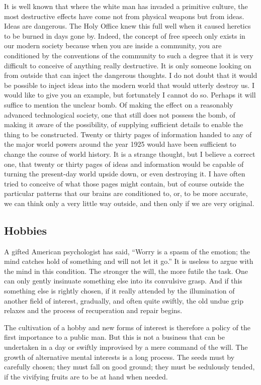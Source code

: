 \documentclass[11pt]{article}
\begin{document}
It is well known that where the white man has invaded a primitive culture, the most destructive effects have come not from physical weapons but from ideas. Ideas are dangerous. The Holy Office knew this full well when it caused heretics to be burned in days gone by. Indeed, the concept of free speech only exists in our modern society because when you are inside a community, you are conditioned by the conventions of the community to such a degree that it is very difficult to conceive of anything really destructive. It is only someone looking on from outside that can inject the dangerous thoughts. I do not doubt that it would be possible to inject ideas into the modern world that would utterly destroy us. I would like to give you an example, but fortunately I cannot do so. Perhaps it will suffice to mention the unclear bomb. Of making the effect on a reasonably advanced technological society, one that still does not possess the bomb, of making it aware of the possibility, of supplying sufficient details to enable the thing to be constructed. Twenty or thirty pages of information handed to any of the major world powers around the year 1925 would have been sufficient to change the course of world history. It is a strange thought, but I believe a correct one, that twenty or thirty pages of ideas and information would be capable of turning the present-day world upside down, or even destroying it. I have often tried to conceive of what those pages might contain, but of course outside the particular patterns that our brains are conditioned to, or, to be more accurate, we can think only a very little way outside, and then only if we are very original.
\subsection{Hobbies}
\label{sec-2-46}

A gifted American psychologist has said, ``Worry is a spasm of the emotion; the mind catches hold of something and will not let it go.'' It is useless to argue with the mind in this condition. The stronger the will, the more futile the task. One can only gently insinuate something else into its convulsive grasp. And if this something else is rightly chosen, if it really attended by the illumination of another field of interest, gradually, and often quite swiftly, the old undue grip relaxes and the process of recuperation and repair begins.

The cultivation of a hobby and new forms of interest is therefore a policy of the first importance to a public man. But this is not a business that can be undertaken in a day or swiftly improvised by a mere command of the will. The growth of alternative mental interests is a long process. The seeds must by carefully chosen; they must fall on good ground; they must be sedulously tended, if the vivifying fruits are to be at hand when needed.
\end{document}
